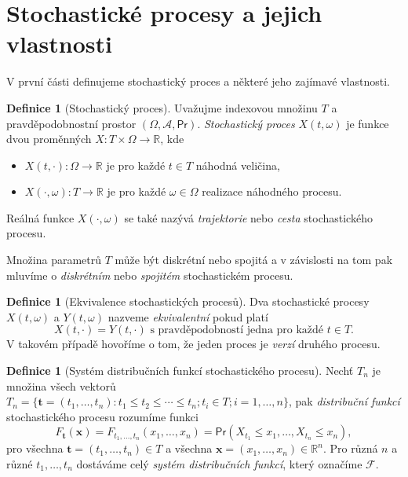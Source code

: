 \documentclass[a4paper,12pt]{report}
\theoremstyle{definition} \newtheorem{definice}[veta]{Definice}
\theoremstyle{remark}
\begin{document}
\section{Stochastické procesy a jejich vlastnosti}
V první části definujeme stochastický proces a některé jeho zajímavé vlastnosti.

\begin{definice}[Stochastický proces]
Uvažujme  indexovou množinu $T$ a prav\-dě\-po\-dob\-nostní prostor $(\Omega,\mathcal{A}, \mathsf{Pr})$.
\textit{Stochastický proces} $X(t,\omega)$ je funkce dvou proměnných $X:T\times\Omega\to\mathbb{R}$, kde
\begin{itemize}
\item $X(t,\cdot):\Omega\to\mathbb{R}$ je pro každé $t\in T$ náhodná veličina,
\item $X(\cdot,\omega):T\to\mathbb{R}$ je pro každé $\omega\in\Omega$ realizace náhodného procesu.
\end{itemize}
Reálná funkce $X(\cdot,\omega)$ se také nazývá \textit{trajektorie} nebo \textit{cesta} stochastického procesu. 
\end{definice}
Množina parametrů $T$ může být diskrétní nebo spojitá a v závislosti na tom pak mluvíme o \textit{diskrétním} nebo \textit{spojitém} stochastickém procesu. 

\begin{definice}[Ekvivalence stochastických procesů]
Dva stochastické procesy $X(t,\omega)$ a $Y(t,\omega)$ nazveme \textit{ekvivalentní} pokud platí
$$X(t,\cdot)=Y(t,\cdot)\text{ s pravděpodobností jedna pro každé }t\in T.$$ 
V takovém případě hovoříme o tom, že jeden proces je \textit{verzí} druhého procesu.
\end{definice}

\begin{definice}[Systém distribučních funkcí stochastického procesu]
Nechť $T_n$ je množina všech vektorů $T_n=\{\boldsymbol{t}=(t_1,\dots,t_n):t_1\leq t_2\leq\cdots\leq t_n; t_i\in T; i=1,\dots,n\}$,
pak \textit{distribuční funkcí} stochastického procesu rozumíme funkci
$$F_{\boldsymbol{t}}(\boldsymbol{x})=F_{t_1,\dots,t_n}(x_1,\dots,x_n)= \mathsf{Pr}(X_{t_1}\leq x_1,\dots,X_{t_n}\leq x_n),$$
pro všechna $\boldsymbol{t}=(t_1,\dots,t_n)\in T$ a všechna $\boldsymbol{x}=(x_1,\dots,x_n)\in \mathbb{R}^n$.
Pro různá $n$ a různé $t_1,\dots,t_n$ dostáváme celý \textit{systém distribučních funkcí}, který označíme $\mathcal{F}$.
\end{definice}
\end{document}
